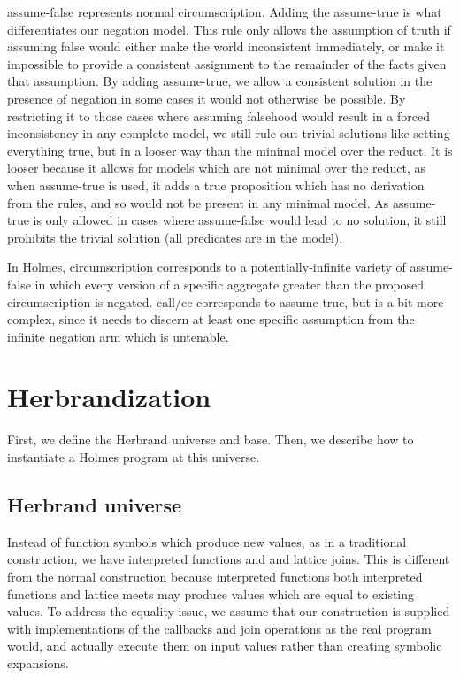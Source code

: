assume-false represents normal circumscription.
Adding the assume-true is what differentiates our negation model.
This rule only allows the assumption of truth if assuming false would either make the world inconsistent immediately, or make it impossible to provide a consistent assignment to the remainder of the facts given that assumption.
By adding assume-true, we allow a consistent solution in the presence of negation in some cases it would not otherwise be possible.
By restricting it to those cases where assuming falsehood would result in a forced inconsistency in any complete model, we still rule out trivial solutions like setting everything true, but in a looser way than the minimal model over the reduct.
It is looser because it allows for models which are not minimal over the reduct, as when assume-true is used, it adds a true proposition which has no derivation from the rules, and so would not be present in any minimal model.
As assume-true is only allowed in cases where assume-false would lead to no solution, it still prohibits the trivial solution (all predicates are in the model).

In Holmes, circumscription corresponds to a potentially-infinite variety of assume-false in which every version of a specific aggregate greater than the proposed circumscription is negated.
call/cc corresponds to assume-true, but is a bit more complex, since it needs to discern at least one specific assumption from the infinite negation arm which is untenable.

\section{Herbrandization}
\label{formal:sec:herbrand}
First, we define the Herbrand universe and base.
Then, we describe how to instantiate a Holmes program at this universe.

\subsection{Herbrand universe}
\label{formal:sec:callbacks}
Instead of function symbols which produce new values, as in a traditional construction, we have interpreted functions and and lattice joins.
This is different from the normal construction because interpreted functions both interpreted functions and lattice meets may produce values which are equal to existing values.
To address the equality issue, we assume that our construction is supplied with implementations of the callbacks and join operations as the real program would, and actually execute them on input values rather than creating symbolic expansions.

